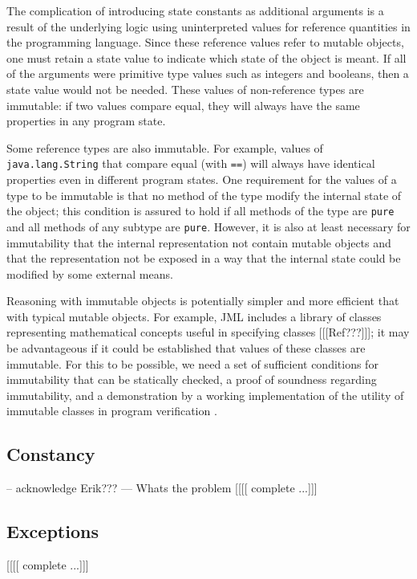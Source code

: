 \documentclass{sig-alternate}
\begin{document}
The complication of introducing state constants as additional arguments is a result of the underlying logic using uninterpreted values for reference quantities in the programming language.
Since these reference values refer to mutable objects, one must retain a state value to 
indicate which state of the object is meant.  If all of the arguments were primitive type values
such as integers and booleans, then a state value would not be needed.  These values of
non-reference types are immutable: if two values compare equal, they will always have the same
properties in any program state. 

Some reference types are also immutable.  For example, values of \texttt{java.lang.String} that
compare equal (with \texttt{==}) will always have identical properties even in different program
states.  One requirement for the values of a type to be immutable is that no method of the type
modify the internal state of the object; this condition is assured to hold if all methods of the type are
\texttt{pure} and all methods of any subtype are \texttt{pure}.  However, it is also at least
necessary for immutability
that the internal representation not contain mutable objects and
that the representation not be exposed  in a way that the internal state could be modified by 
some external means.

Reasoning with immutable objects is potentially simpler and more efficient that with typical
mutable objects.  For example, JML includes a library of classes representing mathematical 
concepts useful in specifying classes [[[Ref???]]]; it may be advantageous if it could be 
established that values of these classes are immutable.  For this to be possible, we need 
a set of sufficient conditions for immutability that can be statically checked, a proof of 
soundness regarding immutability, and a demonstration by a working implementation
of the utility of immutable classes in program verification .

\subsection{Constancy}

-- acknowledge Erik???
--- Whats the problem
[[[[ complete ...]]]


\subsection{Exceptions}

[[[[ complete ...]]]
\end{document}
